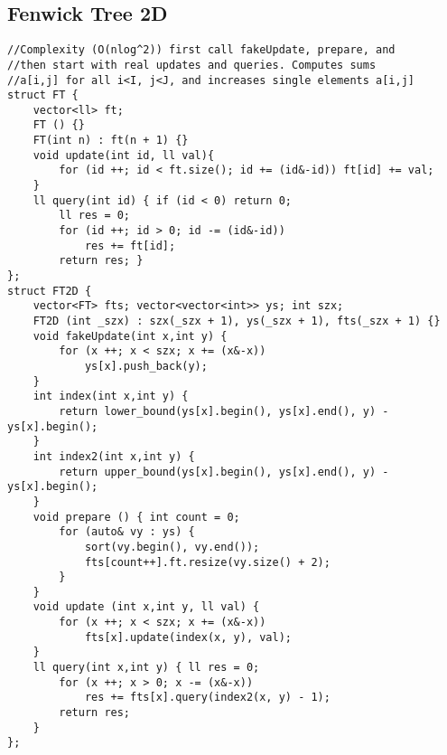 \documentclass[landscape, 8pt, a4paper, oneside]{extarticle}
\begin{document}
\begin{multicols}{3}
\subsection{Fenwick Tree 2D}
\begin{verbatim}
//Complexity (O(nlog^2)) first call fakeUpdate, prepare, and
//then start with real updates and queries. Computes sums
//a[i,j] for all i<I, j<J, and increases single elements a[i,j]
struct FT {
    vector<ll> ft;
    FT () {}
    FT(int n) : ft(n + 1) {}
    void update(int id, ll val){
        for (id ++; id < ft.size(); id += (id&-id)) ft[id] += val;
    }
    ll query(int id) { if (id < 0) return 0;
        ll res = 0;
        for (id ++; id > 0; id -= (id&-id))
            res += ft[id];
        return res; }
};
struct FT2D {
    vector<FT> fts; vector<vector<int>> ys; int szx;
    FT2D (int _szx) : szx(_szx + 1), ys(_szx + 1), fts(_szx + 1) {}
    void fakeUpdate(int x,int y) {
        for (x ++; x < szx; x += (x&-x))
            ys[x].push_back(y);
    }
    int index(int x,int y) {
        return lower_bound(ys[x].begin(), ys[x].end(), y) - ys[x].begin();
    }
    int index2(int x,int y) {
        return upper_bound(ys[x].begin(), ys[x].end(), y) - ys[x].begin();
    }
    void prepare () { int count = 0;
        for (auto& vy : ys) {
            sort(vy.begin(), vy.end());
            fts[count++].ft.resize(vy.size() + 2);
        }
    }
    void update (int x,int y, ll val) {
        for (x ++; x < szx; x += (x&-x))
            fts[x].update(index(x, y), val);
    }
    ll query(int x,int y) { ll res = 0;
        for (x ++; x > 0; x -= (x&-x))
            res += fts[x].query(index2(x, y) - 1);
        return res;
    }
};
\end{verbatim}

\end{multicols}
\end{document}
